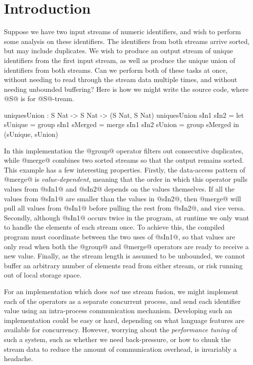 \section{Introduction}
\label{s:Introduction}

Suppose we have two input streams of numeric identifiers, and wish to perform some analysis on these identifiers. The identifiers from both streams arrive sorted, but may include duplicates. We wish to produce an output stream of unique identifiers from the first input stream, as well as produce the unique union of identifiers from both streams. Can we perform both of these tasks at once, without needing to read through the stream data multiple times, and without needing unbounded buffering? Here is how we might write the source code, where @S@ is for @S@-tream.
\begin{code}
  uniquesUnion : S Nat -> S Nat -> (S Nat, S Nat)
  uniquesUnion sIn1 sIn2
   = let  sUnique = group sIn1
          sMerged = merge sIn1 sIn2
          sUnion  = group sMerged
     in   (sUnique, sUnion)
\end{code}

In this implementation the @group@ operator filters out consecutive duplicates, while @merge@ combines two sorted streams so that the output remains sorted. This example has a few interesting properties. Firstly, the data-access pattern of @merge@ is \emph{value-dependent}, meaning that the order in which this operator pulls values from @sIn1@ and @sIn2@ depends on the values themselves. If all the values from @sIn1@ are smaller than the values in @sIn2@, then @merge@ will pull all values from @sIn1@ before pulling the rest from @sIn2@, and vice versa. Secondly, although @sIn1@ occurs twice in the program, at runtime we only want to handle the elements of each stream once. To achieve this, the compiled program must coordinate between the two uses of @sIn1@, so that values are only read when both the @group@ and @merge@ operators are ready to receive a new value. Finally, as the stream length is assumed to be unbounded, we cannot buffer an arbitrary number of elements read from either stream, or risk running out of local storage space.

For an implementation which does \emph{not} use stream fusion, we might implement each of the operators as a separate concurrent process, and send each identifier value using an intra-process communication mechanism. Developing such an implementation could be easy or hard, depending on what language features are available for concurrency. However, worrying about the \emph{performance tuning} of such a system, such as whether we need back-pressure, or how to chunk the stream data to reduce the amount of communication overhead, is invariably a headache. 

